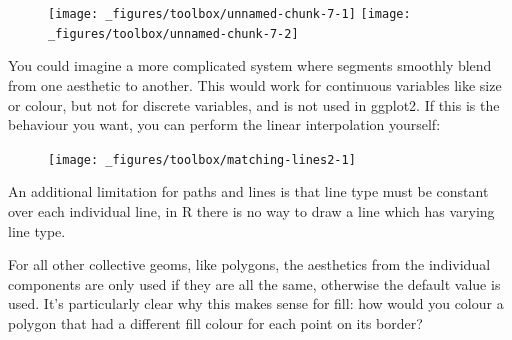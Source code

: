 \begin{figure}[H]
  \texttt{[image: \_figures/toolbox/unnamed-chunk-7-1]}%
  \texttt{[image: \_figures/toolbox/unnamed-chunk-7-2]}
\end{figure}

You could imagine a more complicated system where segments smoothly
blend from one aesthetic to another. This would work for continuous
variables like size or colour, but not for discrete variables, and is
not used in ggplot2. If this is the behaviour you want, you can perform
the linear interpolation yourself:

\begin{Shaded}
\begin{Highlighting}[]
\StringTok{ }\NormalTok{(} \NormalTok{))}
\StringTok{ }\NormalTok{(}
   
    
    
\NormalTok{)}
 \StringTok{ }
\StringTok{  }\NormalTok{(} \NormalTok{) +}
\StringTok{  }\NormalTok{(}  \NormalTok{)}
\end{Highlighting}
\end{Shaded}

\begin{figure}[H]
  \centering
  \texttt{[image: \_figures/toolbox/matching-lines2-1]}
\end{figure}

An additional limitation for paths and lines is that line type must be
constant over each individual line, in R there is no way to draw a line
which has varying line type.  

For all other collective geoms, like polygons, the aesthetics from the
individual components are only used if they are all the same, otherwise
the default value is used. It's particularly clear why this makes sense
for fill: how would you colour a polygon that had a different fill
colour for each point on its border? 

